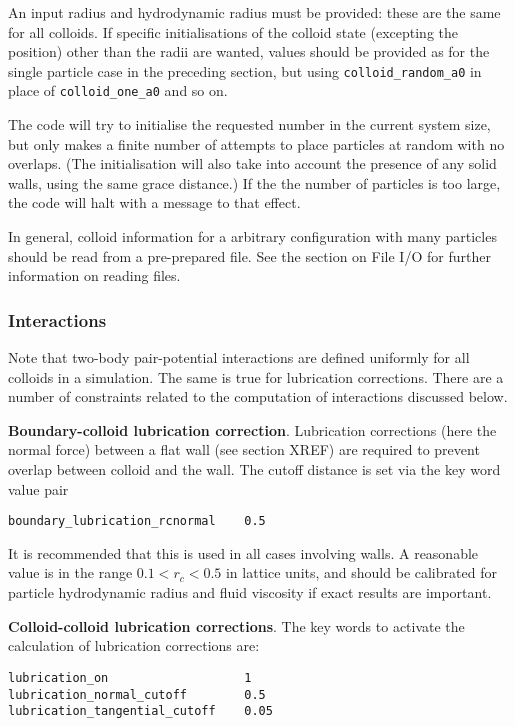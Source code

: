 An input radius and hydrodynamic radius must be provided: these
are the same for all colloids.
If specific initialisations of the colloid state (excepting the
position) other than the radii are wanted, values should be provided
as for the single particle case in the preceding section, but using
\texttt{colloid\_random\_a0} in place of
\texttt{colloid\_one\_a0} and so on.

The code will try to initialise the requested number in the current
system size, but only makes a finite number of attempts to place
particles at random with no overlaps. (The initialisation will also
take into account the presence of any solid walls, using the same
grace distance.) If the the number of particles is too large, the
code will halt with a message to that effect.

In general, colloid information for a arbitrary configuration with many
particles should be read from a pre-prepared file. See the section on
File I/O for further information on reading files.


\subsubsection{Interactions}

Note that two-body pair-potential interactions are defined uniformly for
all colloids in a simulation. The same is true for lubrication corrections.
There are a number of constraints related to the computation of
interactions discussed below.

{\bf Boundary-colloid lubrication correction}.
Lubrication corrections (here the normal force) between a flat wall
(see section XREF) are
required to prevent overlap between colloid  and the wall.
The cutoff distance is set via the key word value pair
\begin{lstlisting}
boundary_lubrication_rcnormal    0.5
\end{lstlisting}
It is recommended that this is used in all cases involving walls.
A reasonable value is in the range $0.1 < r_c < 0.5$ in lattice
units, and should be calibrated for particle hydrodynamic radius
and fluid viscosity if exact results are important.

{\bf Colloid-colloid lubrication corrections}.
The key words to activate the calculation of lubrication corrections
are:
\begin{lstlisting}
lubrication_on                   1
lubrication_normal_cutoff        0.5
lubrication_tangential_cutoff    0.05
\end{lstlisting}



